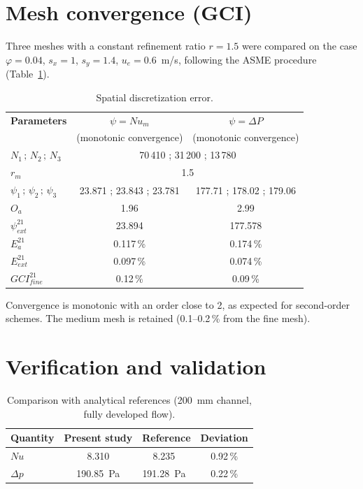 \documentclass[11pt,a4paper]{article}
\begin{document}
\section{Mesh convergence (GCI)}
Three meshes with a constant refinement ratio $r = 1.5$ were compared on the case $\varphi = 0.04$, $s_x = 1$, $s_y = 1.4$, $u_e = 0.6$~m/s, following the ASME procedure~\cite{celik2008} (Table~\ref{tab:gci}).

\begin{table}[H]
\centering
\caption{Spatial discretization error.}
\label{tab:gci}
\renewcommand{\arraystretch}{1.25}
\begin{tabular}{lcc}
\toprule
\textbf{Parameters} & $\psi = Nu_m$ & $\psi = \Delta P$ \\
 & {\small (monotonic convergence)} & {\small (monotonic convergence)} \\
\midrule
$N_1\,;\,N_2\,;\,N_3$ & \multicolumn{2}{c}{70\,410 ; 31\,200 ; 13\,780} \\
$r_m$ & \multicolumn{2}{c}{1.5} \\
\midrule
$\psi_1\,;\,\psi_2\,;\,\psi_3$ & 23.871 ; 23.843 ; 23.781 & 177.71 ; 178.02 ; 179.06 \\
$O_a$ & 1.96 & 2.99 \\
$\psi_{ext}^{21}$ & 23.894 & 177.578 \\
$E_a^{21}$ & 0.117\,\% & 0.174\,\% \\
$E_{ext}^{21}$ & 0.097\,\% & 0.074\,\% \\
$GCI_{fine}^{21}$ & 0.12\,\% & 0.09\,\% \\
\bottomrule
\end{tabular}
\end{table}

Convergence is monotonic with an order close to 2, as expected for second-order schemes. The medium mesh is retained (0.1--0.2\,\% from the fine mesh).

\section{Verification and validation}
\begin{table}[H]
\centering
\caption{Comparison with analytical references (200~mm channel, fully developed flow).}
\label{tab:valid}
\begin{tabular}{lccc}
\toprule
Quantity & Present study & Reference & Deviation \\
\midrule
$Nu$ & 8.310 & 8.235~\cite{shah1978} & 0.92\,\% \\
$\Delta p$ & 190.85~Pa & 191.28~Pa~\cite{shah1978} & 0.22\,\% \\
\bottomrule
\end{tabular}
\end{table}
\end{document}
